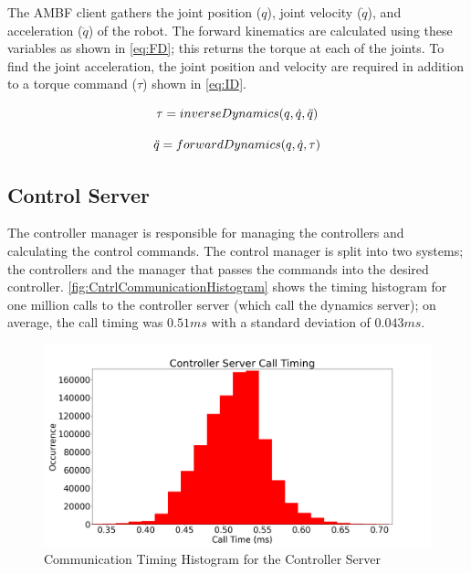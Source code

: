 The AMBF client gathers the joint position ($q$), joint velocity ($\Dot{q}$), and acceleration ($\DDot{q}$) of the robot.  The forward kinematics are calculated using these variables as shown in \autoref{eq:FD}; this returns the torque at each of the joints. To find the joint acceleration, the joint position and velocity are required in addition to a torque command ($\tau$) shown in \autoref{eq:ID}.  

\begin{equation}
    \Large
    \tau = inverseDynamics(q,\Dot{q}, \Ddot{q})
    \label{eq:ID}
\end{equation}


\begin{equation}
    \Large
    \Ddot{q} = forwardDynamics(q,\Dot{q}, \tau )
    \label{eq:FD}
\end{equation}



 
 
 \subsection{Control Server}
 
 The controller manager is responsible for managing the controllers and calculating the control commands. The control manager is split into two systems; the controllers and the manager that passes the commands into the desired controller. 
\autoref{fig:CntrlCommunicationHistogram} shows the timing histogram for one million calls to the controller server (which call the dynamics server); on average, the call timing was $0.51ms$ with a standard deviation of $0.043ms$.  

 \begin{figure}
     \centering
     \includegraphics[scale=0.35]{images/software/control_loop_timing.png}
     \caption[Controller Server Timing Histogram]{Communication Timing Histogram for the Controller Server}
     \label{fig:CntrlCommunicationHistogram}
 \end{figure}


